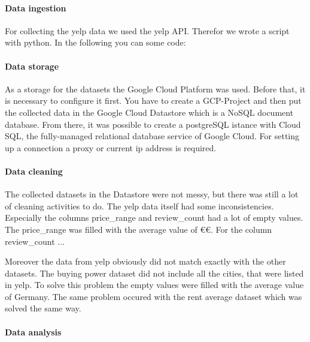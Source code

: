 \paragraph{Data ingestion}
\label{subsec:Data ingestion}
For collecting the yelp data we used the yelp API. Therefor we wrote a script with python. In the following you can some code:

\paragraph{Data storage}
\label{subsec:Data storage}
As a storage for the datasets the Google Cloud Platform was used. Before that, it is necessary to configure it first. You have to create a GCP-Project and then put the collected data in the Google Cloud Datastore which is a NoSQL document database. From there, it was possible to create a postgreSQL istance with Cloud SQL, the fully-managed relational database service of Google Cloud. For setting up a connection a proxy or current ip address is required.

\paragraph{Data cleaning}
\label{subsec:Data cleaning}
The collected datasets in the Datastore were not messy, but there was still a lot of cleaning activities to do. The yelp data itself had some inconsistencies. Especially the columns price\_range and review\_count had a lot of empty values. The price\_range was filled with the average value of \euro\euro. For the column review\_count ...%

Moreover the data from yelp obviously did not match exactly with the other datasets. The buying power dataset did not include all the cities, that were listed in yelp. To solve this problem the empty values were filled with the average value of Germany. The same problem occured with the rent average dataset which was solved the same way.

\paragraph{Data analysis}
\label{subsec:Data analysis}
